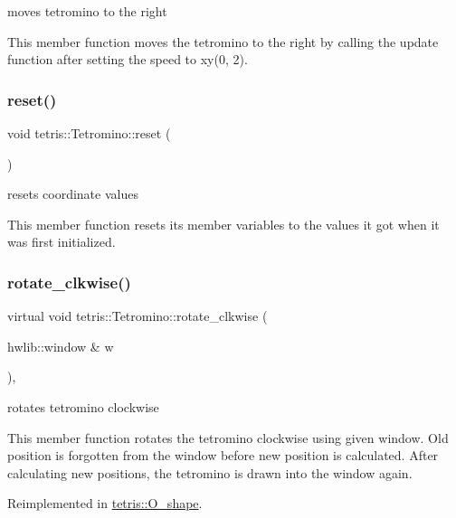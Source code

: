 moves tetromino to the right 

This member function moves the tetromino to the right by calling the update function after setting the speed to xy(0, 2). \mbox{\label{classtetris_1_1Tetromino_a36ccceea1c911da05f9a7e7406ecde0a}} 
\subsubsection{\texorpdfstring{reset()}{reset()}}
{\footnotesize\ttfamily void tetris\+::\+Tetromino\+::reset (\begin{DoxyParamCaption}{ }\end{DoxyParamCaption})\hspace{0.3cm}{\ttfamily [inline]}}



resets coordinate values 

This member function resets its member variables to the values it got when it was first initialized. \mbox{\label{classtetris_1_1Tetromino_a18a7c7e9f0caa52f425d99a818a1e2d2}} 
\subsubsection{\texorpdfstring{rotate\+\_\+clkwise()}{rotate\_clkwise()}}
{\footnotesize\ttfamily virtual void tetris\+::\+Tetromino\+::rotate\+\_\+clkwise (\begin{DoxyParamCaption}\item[{hwlib\+::window \&}]{w }\end{DoxyParamCaption})\hspace{0.3cm}{\ttfamily [inline]}, {\ttfamily [virtual]}}



rotates tetromino clockwise 

This member function rotates the tetromino clockwise using given window. Old position is forgotten from the window before new position is calculated. After calculating new positions, the tetromino is drawn into the window again. 

Reimplemented in \hyperlink{classtetris_1_1O__shape_ad7372dc4b9b832ba1fe90488b15de95f}{tetris\+::\+O\+\_\+shape}.


